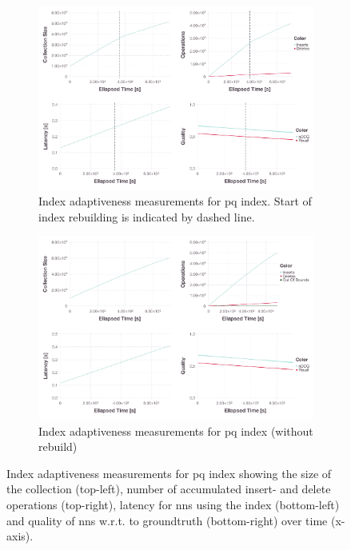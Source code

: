 \begin{figure}[p]
    \centering
    \begin{subfigure}[b]{\textwidth}
        \centering
        \includegraphics[width=\textwidth]{figures/index/index-pq-adaptiveness-with-rebuild}
        \caption{Index adaptiveness measurements for \acrshort{pq} index. Start of index rebuilding is indicated by dashed line.}
        \label{figure:index_adaptiveness_pq_rebuild}
    \end{subfigure}
    \hfill
    \centering
    \begin{subfigure}[b]{\textwidth}
        \centering
        \includegraphics[width=\textwidth]{figures/index/index-pq-adaptiveness-no-rebuild}
        \caption{Index adaptiveness measurements for \acrshort{pq} index (without rebuild)}
        \label{figure:index_adaptiveness_pq_no_rebuild}
    \end{subfigure}
    \caption{Index adaptiveness measurements for \acrshort{pq} index showing the size of the collection (top-left), number of accumulated insert- and delete operations (top-right), latency for \acrshort{nns} using the index (bottom-left) and quality of \acrshort{nns} w.r.t. to groundtruth (bottom-right) over time (x-axis).}
    \label{figure:index_adaptiveness_pq}
\end{figure}
